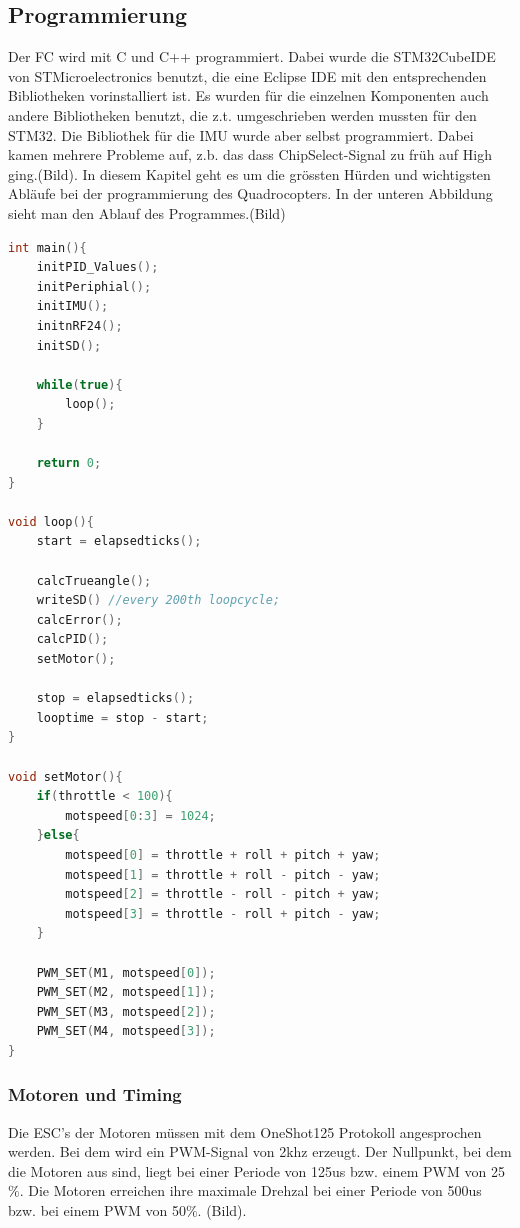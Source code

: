 \documentclass[12pt,a4paper, ngerman]{article}
\begin{document}
\subsection{Programmierung}
Der FC wird mit C und C++ programmiert. Dabei wurde die STM32CubeIDE von STMicroelectronics benutzt, die eine Eclipse IDE mit den entsprechenden Bibliotheken vorinstalliert ist. Es wurden für die einzelnen Komponenten auch andere Bibliotheken benutzt, die z.t. umgeschrieben werden mussten für den STM32. Die Bibliothek für die IMU wurde aber selbst programmiert. Dabei kamen mehrere Probleme auf, z.b. das dass ChipSelect-Signal zu früh auf High ging.(Bild). In diesem Kapitel geht es um die grössten Hürden und wichtigsten Abläufe bei der programmierung des Quadrocopters. In der unteren Abbildung sieht man den Ablauf des Programmes.(Bild)

\begin{lstlisting}[language=C++,caption=Programmablauf Pseudocode]
int main(){
	initPID_Values();
	initPeriphial();
	initIMU();
	initnRF24();
	initSD();
	
	while(true){
		loop();
	}
	
	return 0;
}

void loop(){
	start = elapsedticks();
	
	calcTrueangle();
	writeSD() //every 200th loopcycle;
	calcError();
	calcPID();
	setMotor();
	
	stop = elapsedticks();
	looptime = stop - start;
}

void setMotor(){
	if(throttle < 100){
		motspeed[0:3] = 1024;	
	}else{
		motspeed[0] = throttle + roll + pitch + yaw; 
		motspeed[1]	= throttle + roll - pitch - yaw;
		motspeed[2]	= throttle - roll - pitch + yaw;
		motspeed[3]	= throttle - roll + pitch - yaw;
	}
	
	PWM_SET(M1, motspeed[0]);
	PWM_SET(M2, motspeed[1]);
	PWM_SET(M3, motspeed[2]);
	PWM_SET(M4, motspeed[3]);
}
\end{lstlisting}


\subsubsection{Motoren und Timing}
Die ESC's der Motoren müssen mit dem OneShot125 Protokoll\cite{website:OL_OneShot125} angesprochen werden. Bei dem wird ein PWM-Signal von 2khz erzeugt. Der Nullpunkt, bei dem die Motoren aus sind, liegt bei einer Periode von 125us bzw. einem PWM von 25$\%$. Die Motoren erreichen ihre maximale Drehzal bei einer Periode von 500us bzw. bei einem PWM von 50$\%$. (Bild).
\end{document}
